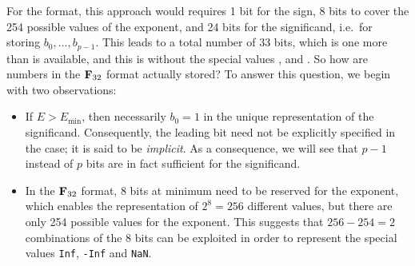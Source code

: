 For the  format,
this approach would requires 1 bit for the sign,
8 bits to cover the 254 possible values of the exponent, and 24 bits for the significand,
i.e.\ for storing $b_0, \dots, b_{p-1}$.
This leads to a total number of 33 bits,
which is one more than is available,
and this is without the special values ,  and .
So how are numbers in the $\mathbf F_{32}$ format actually stored?
To answer this question,
we begin with two observations:
\begin{itemize}
    \item
        If $E > E_{\min}$,
        then necessarily $b_0 = 1$ in the unique representation of the significand.
        Consequently, the leading bit need not be explicitly specified in the case;
        it is said to be \emph{implicit}.
        As a consequence,
        we will see that $p-1$ instead of $p$ bits are in fact sufficient for the significand.
    \item
        In the $\mathbf F_{32}$ format,
        8 bits at minimum need to be reserved for the exponent,
        which enables the representation of $2^8 = 256$ different values,
        but there are only 254 possible values for the exponent.
        This suggests that $256 - 254 = 2$ combinations of the 8 bits can be exploited in order to
        represent the special values \texttt{Inf}, \texttt{-Inf} and \texttt{NaN}.
\end{itemize}

